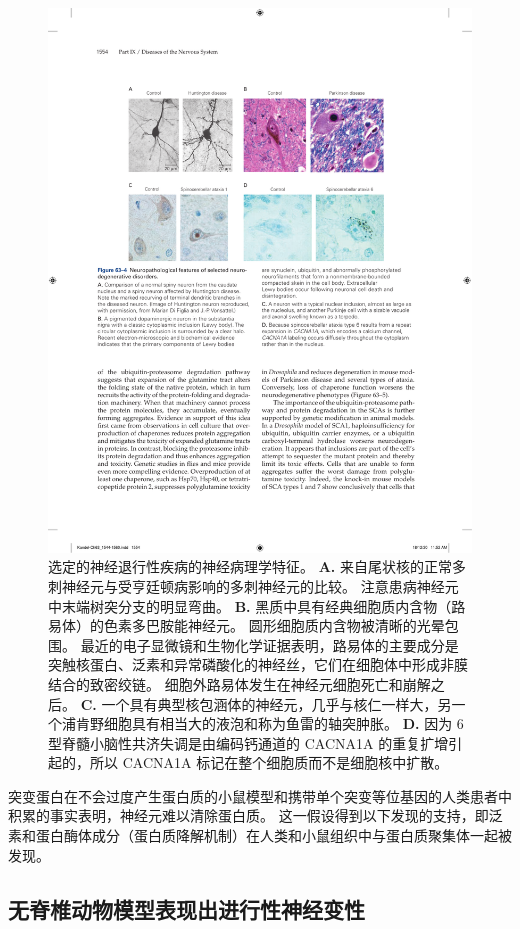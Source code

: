 \begin{figure}[htbp]
	\centering
	\includegraphics[width=0.8\linewidth]{chap63/fig_63_4}
	\caption{选定的神经退行性疾病的神经病理学特征。
		\textbf{A.} 来自尾状核的正常多刺神经元与受亨廷顿病影响的多刺神经元的比较。
		注意患病神经元中末端树突分支的明显弯曲。
		\textbf{B.} 黑质中具有经典细胞质内含物（路易体）的色素多巴胺能神经元。
		圆形细胞质内含物被清晰的光晕包围。
		最近的电子显微镜和生物化学证据表明，路易体的主要成分是突触核蛋白、泛素和异常磷酸化的神经丝，它们在细胞体中形成非膜结合的致密绞链。
		细胞外路易体发生在神经元细胞死亡和崩解之后。
		\textbf{C.} 一个具有典型核包涵体的神经元，几乎与核仁一样大，另一个浦肯野细胞具有相当大的液泡和称为鱼雷的轴突肿胀。
		\textbf{D.} 因为 6 型脊髓小脑性共济失调是由编码钙通道的 CACNA1A 的重复扩增引起的，所以 CACNA1A 标记在整个细胞质而不是细胞核中扩散。}
	\label{fig:63_4}
\end{figure}


突变蛋白在不会过度产生蛋白质的小鼠模型和携带单个突变等位基因的人类患者中积累的事实表明，神经元难以清除蛋白质。
这一假设得到以下发现的支持，即泛素和蛋白酶体成分（蛋白质降解机制）在人类和小鼠组织中与蛋白质聚集体一起被发现。



\subsection{无脊椎动物模型表现出进行性神经变性}

